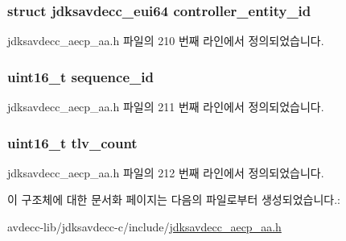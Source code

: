 \subsubsection[{\texorpdfstring{controller\+\_\+entity\+\_\+id}{controller_entity_id}}]{\setlength{\rightskip}{0pt plus 5cm}struct {\bf jdksavdecc\+\_\+eui64} controller\+\_\+entity\+\_\+id}\hypertarget{structjdksavdecc__aecp__aa_affc928ddb4fc62d1d04a775d36e5f2c8}{}\label{structjdksavdecc__aecp__aa_affc928ddb4fc62d1d04a775d36e5f2c8}


jdksavdecc\+\_\+aecp\+\_\+aa.\+h 파일의 210 번째 라인에서 정의되었습니다.

\subsubsection[{\texorpdfstring{sequence\+\_\+id}{sequence_id}}]{\setlength{\rightskip}{0pt plus 5cm}uint16\+\_\+t sequence\+\_\+id}\hypertarget{structjdksavdecc__aecp__aa_a8f184eb7c16a6d3a501c383ee8ffa200}{}\label{structjdksavdecc__aecp__aa_a8f184eb7c16a6d3a501c383ee8ffa200}


jdksavdecc\+\_\+aecp\+\_\+aa.\+h 파일의 211 번째 라인에서 정의되었습니다.

\subsubsection[{\texorpdfstring{tlv\+\_\+count}{tlv_count}}]{\setlength{\rightskip}{0pt plus 5cm}uint16\+\_\+t tlv\+\_\+count}\hypertarget{structjdksavdecc__aecp__aa_a038fe0548939dfb79822e59885732e2a}{}\label{structjdksavdecc__aecp__aa_a038fe0548939dfb79822e59885732e2a}


jdksavdecc\+\_\+aecp\+\_\+aa.\+h 파일의 212 번째 라인에서 정의되었습니다.



이 구조체에 대한 문서화 페이지는 다음의 파일로부터 생성되었습니다.\+:\begin{DoxyCompactItemize}
\item 
avdecc-\/lib/jdksavdecc-\/c/include/\hyperlink{jdksavdecc__aecp__aa_8h}{jdksavdecc\+\_\+aecp\+\_\+aa.\+h}\end{DoxyCompactItemize}
